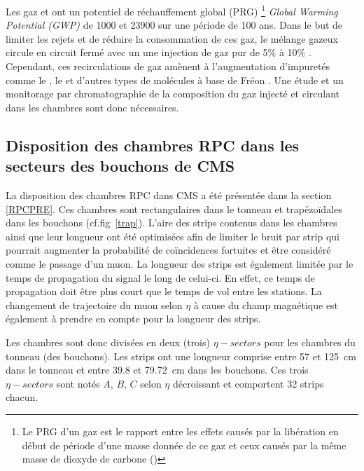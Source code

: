 Les gaz  et  ont un  potentiel de réchauffement global (PRG) \footnote{Le PRG d’un gaz est le rapport entre les effets causés par la libération en début de période d’une masse donnée de ce gaz et ceux causés par la même masse de dioxyde de carbone ()} \textit{Global Warming Potential (GWP)} de \num{1000} et \num{23900} sur une période de \num{100} ans. Dans le but de limiter les rejets et de réduire la consommation de ces gaz, le mélange gazeux circule en circuit fermé avec un une injection de gaz pur de \num{5}\% à \num{10}\% \cite{5401780}. Cependant, ces recirculations de gaz amènent à l'augmentation d'impuretés comme le , le  et d'autres types de molécules à base de Fréon \cite{1748-0221-8-08-T08003}. Une étude et un monitorage par chromatographie de la composition du gaz injecté et circulant dans les chambres sont donc nécessaires. 

\subsection{Disposition des chambres RPC dans les secteurs des bouchons de CMS}
\vspace{-0.2cm}
La disposition des chambres RPC dans CMS a été présentée dans la section \ref{RPCPRE}. Ces chambres sont rectangulaires dans le tonneau et trapézoïdales dans les bouchons (cf.fig~\ref{trap}). L'aire des strips contenus dans les chambres ainsi que leur longueur ont été optimisées afin de limiter le bruit par strip qui pourrait augmenter la probabilité de coïncidences fortuites et être considéré comme le passage d'un muon. La longueur des strips est également limitée par le temps de propagation du signal le long de celui-ci. En effet, ce temps de propagation doit être plus court que le temps de vol entre les stations. La changement de trajectoire du muon selon $\eta$ à cause du champ magnétique est également à prendre en compte pour la longueur des strips.

Les chambres sont donc divisées en deux (trois) $\eta-sectors$ pour les chambres du tonneau (des bouchons). Les strips ont une longueur comprise entre \num{57} et \SI{125}{\centi\meter} dans le tonneau et entre \num{39.8} et \SI{79.72}{\centi\meter} dans les bouchons. Ces trois $\eta-sectors$ sont notés $A$, $B$, $C$ selon $\eta$ décroissant et comportent \num{32} strips chacun.

